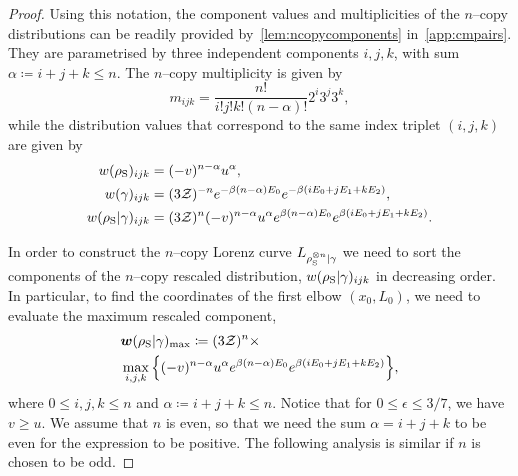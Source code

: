 \documentclass[pra,
aps,
twocolumn,
superscriptaddress,
groupedaddress,
nofootinbib,
reprint
]{revtex4-1}
\begin{document}
\begin{proof}
Using this notation, the component values and multiplicities of the $n$--copy distributions can be readily provided by~\cref{lem:ncopycomponents} in~\cref{app:cmpairs}.
They are parametrised by three independent components $i,j,k$, with sum $\alpha \coloneqq i+j+k \leq n$.
The $n$--copy multiplicity is given by
\begin{equation}
	m_{ijk} = \frac{n!}{i!j!k!(n-\alpha)!} 2^i 3^j 3^k,
\end{equation}
while the distribution values that correspond to the same index triplet $(i,j,k)$ are given by
\begin{align}
	w(\rho_{\rm{S}})_{ijk} &= (-v)^{n-\alpha} u^{\alpha}, \\
	w(\gamma)_{ijk} &= (3\mathcal{Z})^{-n} e^{-\beta (n-\alpha)E_0} e^{-\beta ( i E_0 + j E_1 + k E_2 )}, \\
	w(\rho_{\rm{S}} | \gamma)_{ijk} &= (3\mathcal{Z})^{n} (-v)^{n-\alpha} u^{\alpha} e^{\beta (n-\alpha)E_0} e^{\beta ( i E_0 + j E_1 + k E_2 )}.
\end{align}

In order to construct the $n$--copy Lorenz curve ${L_{\rho_{\rm{S}}^{\otimes n}|\gamma}}$ we need to sort the components of the $n$--copy rescaled distribution, $w(\rho_{\rm{S}} | \gamma)_{ijk}$ in decreasing order.
In particular, to find the coordinates of the first elbow $(x_0, L_0)$, we need to evaluate the maximum rescaled component,
\begin{align}
	&\bm{w}(\rho_{\rm{S}} | \gamma)_{\rm{max}} \coloneqq (3\mathcal{Z})^{n}\times \nonumber\\
	&\max\limits_{i,j,k}\Big\{ (-v)^{n-\alpha} u^{\alpha} e^{\beta (n-\alpha)E_0} e^{\beta ( i E_0 + j E_1 + k E_2 )} \Big\}, \label{eq:max_slope}
\end{align}
where $0 \leq i,j,k \leq n$ and $\alpha \coloneqq i+j+k \leq n$.
Notice that for $0 \leq \epsilon \leq 3/7$, we have $v \geq u$. 
We assume that $n$ is even, so that we need the sum $\alpha = i+j+k$ to be even for the expression to be positive. 
The following analysis is similar if $n$ is chosen to be odd.


\end{proof}
\end{document}
